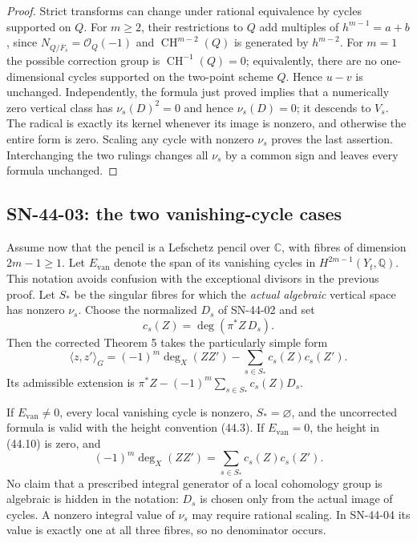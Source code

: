 \documentclass[11pt,a4paper]{article}
\theoremstyle{definition}
\theoremstyle{remark}
\begin{document}
\begin{proof}
Strict transforms can change under rational equivalence by cycles
supported on $Q$.  For $m\ge2$, their restrictions to $Q$ add
multiples of $h^{m-1}=a+b$, since
$N_{Q/\overline F_s}=\mathcal O_Q(-1)$ and
$\operatorname{CH}^{m-2}(Q)$ is generated by $h^{m-2}$.
For $m=1$ the possible correction group is
$\operatorname{CH}^{-1}(Q)=0$; equivalently, there are no
one-dimensional cycles supported on the two-point scheme $Q$.
Hence $u-v$ is unchanged.  Independently, the formula just proved implies
that a numerically zero vertical class has $\nu_s(D)^2=0$ and hence
$\nu_s(D)=0$; it descends to $V_s$.  The radical is exactly its
kernel whenever its image is nonzero, and otherwise the entire
form is zero.  Scaling any cycle with nonzero $\nu_s$ proves the
last assertion.  Interchanging the two rulings changes all $\nu_s$
by a common sign and leaves every formula unchanged.
\end{proof}

\subsection{SN-44-03: the two vanishing-cycle cases}
\label{sn:44-03}

Assume now that the pencil is a Lefschetz pencil over $\mathbb C$,
with fibres of dimension $2m-1\ge1$.  Let $E_{\mathrm{van}}$ denote
the span of its vanishing cycles in $H^{2m-1}(Y_t,\mathbb Q)$.
This notation avoids confusion with the exceptional divisors in the
previous proof.  Let $S_*$ be the singular fibres for which the
\emph{actual algebraic} vertical space has nonzero $\nu_s$.
Choose the normalized $D_s$ of SN-44-02 and set
\[
 c_s(Z)=\deg(\pi^*Z\,D_s).
\]
Then the corrected Theorem 5 takes the particularly simple form
\[
 \boxed{\quad
 \langle z,z'\rangle_G
   =(-1)^m\deg_X(ZZ')-\sum_{s\in S_*}c_s(Z)c_s(Z').
 \quad}                                                    \tag{44.10}
 \label{eq:44-node-correction}
\]
Its admissible extension is
$\pi^*Z-(-1)^m\sum_{s\in S_*}c_s(Z)D_s$.

If $E_{\mathrm{van}}\ne0$, every local vanishing cycle is nonzero,
$S_*=\varnothing$, and the uncorrected formula is valid with the
height convention (44.3).  If $E_{\mathrm{van}}=0$, the height in
(44.10) is zero, and
\[
 (-1)^m\deg_X(ZZ')=\sum_{s\in S_*}c_s(Z)c_s(Z').             \tag{44.11}
\]
No claim that a prescribed integral generator of a local cohomology
group is algebraic is hidden in the notation: $D_s$ is chosen only
from the actual image of cycles.  A nonzero integral value of
$\nu_s$ may require rational scaling.  In SN-44-04 its value is
exactly one at all three fibres, so no denominator occurs.
\end{document}
